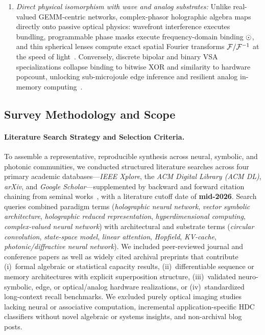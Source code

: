 \begin{enumerate}
    \item \emph{Direct physical isomorphism with wave and analog substrates:} Unlike real-valued GEMM-centric networks, complex-phasor holographic algebra maps directly onto passive optical physics: wavefront interference executes bundling, programmable phase masks execute frequency-domain binding $\odot$, and thin spherical lenses compute exact spatial Fourier transforms $\mathcal{F} / \mathcal{F}^{-1}$ at the speed of light~\cite{SHEN_PHOTONIC_MZI,LIN_DIFFRACTIVE_OPTICAL_NN,WETZSTEIN_2020_OPTICAL_AI}. Conversely, discrete bipolar and binary VSA specializations collapse binding to bitwise XOR and similarity to hardware popcount, unlocking sub-microjoule edge inference and resilient analog in-memory computing~\cite{RAHIMI_HDC_EDGE,KARUNARATNE_2020_PCM_HDC}.
\end{enumerate}

\subsection{Survey Methodology and Scope}\label{sec:intro:methodology}

\paragraph{Literature Search Strategy and Selection Criteria.}
To assemble a representative, reproducible synthesis across neural, symbolic, and photonic communities, we conducted structured literature searches across four primary academic databases---\emph{IEEE Xplore}, the \emph{ACM Digital Library (ACM DL)}, \emph{arXiv}, and \emph{Google Scholar}---supplemented by backward and forward citation chaining from seminal works~\cite{GABOR_1948_HOLOGRAPHY,SUTHERLAND_1990_HNN,PLATE_1995_HRR,KANERVA_2009_HDC,RAMSAUER_MODERN_HOPFIELD,GU_SSM_S4_MAMBA}, with a literature cutoff date of \textbf{mid-2026}.
Search queries combined paradigm terms (\emph{holographic neural network}, \emph{vector symbolic architecture}, \emph{holographic reduced representation}, \emph{hyperdimensional computing}, \emph{complex-valued neural network}) with architectural and substrate terms (\emph{circular convolution}, \emph{state-space model}, \emph{linear attention}, \emph{Hopfield}, \emph{KV-cache}, \emph{photonic/diffractive neural network}).
We included peer-reviewed journal and conference papers as well as widely cited archival preprints that contribute (i)~formal algebraic or statistical capacity results, (ii)~differentiable sequence or memory architectures with explicit superposition structure, (iii)~validated neuro-symbolic, edge, or optical/analog hardware realizations, or (iv)~standardized long-context recall benchmarks.
We excluded purely optical imaging studies lacking neural or associative computation, incremental application-specific HDC classifiers without novel algebraic or systems insights, and non-archival blog posts.

